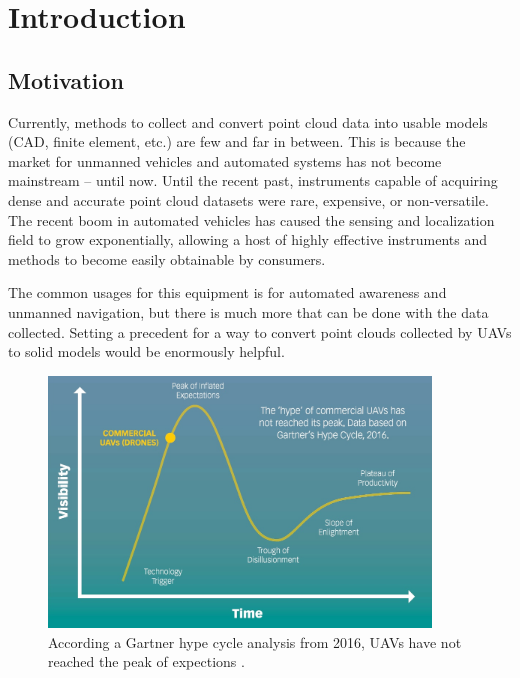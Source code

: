 \documentclass[12pt]{drexelthesis}
\let\Oldsection\section
\renewcommand{\section}{\FloatBarrier\Oldsection}
\begin{document}
\setcounter{page}{0}





\chapter{Introduction}
\label{chap:introduction}
\section{Motivation}
Currently, methods to collect and convert point cloud data into usable models (CAD, finite element, etc.) are few and far in between. This is because the market for unmanned vehicles and automated systems has not become mainstream -- until now. Until the recent past, instruments capable of acquiring dense and accurate point cloud datasets were rare, expensive, or non-versatile. The recent boom in automated vehicles has caused the sensing and localization field to grow exponentially, allowing a host of highly effective instruments and methods to become easily obtainable by consumers.

The common usages for this equipment is for automated awareness and unmanned navigation, but there is much more that can be done with the data collected. Setting a precedent for a way to convert point clouds collected by UAVs to solid models would be enormously helpful.

\begin{figure}
	\centering
		\includegraphics[width=4in]{motivation/uav-hype-cycle.jpg}
		\caption[Current status of UAVs according to the Gartner hype cycle]{ According a Gartner hype cycle analysis from 2016, UAVs have not reached the peak of expections \cite{gartner}.}
\end{figure}
\end{document}
